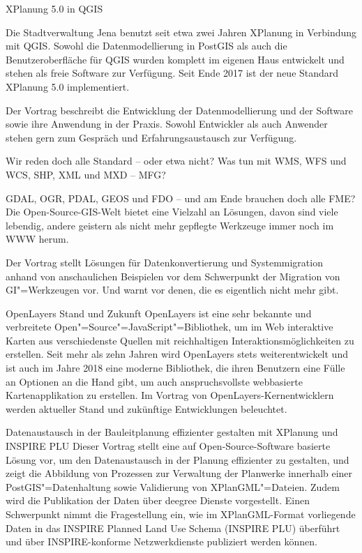 %
{XPlanung 5.0 in QGIS}%
{}%
{
Die Stadtverwaltung Jena benutzt seit etwa zwei Jahren XPlanung in Verbindung mit QGIS. Sowohl die
Datenmodellierung in PostGIS als auch die Benutzeroberfläche für QGIS wurden komplett im eigenen
Haus entwickelt und stehen als freie Software zur Verfügung. Seit Ende 2017 ist der neue Standard
XPlanung 5.0 implementiert.

Der Vortrag beschreibt die Entwicklung der Datenmodellierung und der
Software sowie ihre Anwendung in der Praxis. Sowohl Entwickler als auch Anwender stehen gern zum
Gespräch und Erfahrungsaustausch zur Verfügung.
}


%
{Wir reden doch alle Standard -- oder etwa nicht?}%
{Was tun mit WMS, WFS und WCS, SHP, XML und MXD -- MFG?}%
{
GDAL, OGR, PDAL, GEOS und FDO -- und am Ende brauchen doch alle FME?
Die Open-Source-GIS-Welt bietet eine Vielzahl an Lösungen, davon sind viele lebendig, andere
geistern als nicht mehr gepflegte Werkzeuge immer noch im WWW herum.

Der Vortrag stellt Lösungen
für Datenkonvertierung und Systemmigration anhand von anschaulichen Beispielen vor dem Schwerpunkt
der Migration von GI"=Werkzeugen vor. Und warnt vor denen, die es eigentlich nicht mehr gibt.%
}

%
{OpenLayers}%
{Stand und Zukunft}%
{
OpenLayers ist eine sehr bekannte und verbreitete Open"=Source"=JavaScript"=Bibliothek, um im Web
interaktive Karten aus verschiedenste Quellen mit reichhaltigen Interaktionsmöglichkeiten zu erstellen.
Seit mehr als zehn Jahren wird OpenLayers stets weiterentwickelt und ist auch im Jahre 2018 eine
moderne Bibliothek, die ihren Benutzern eine Fülle an Optionen an die Hand gibt, um auch
anspruchsvollste webbasierte Kartenapplikation zu erstellen.
%
Im Vortrag von OpenLayers-Kernentwicklern werden aktueller Stand und zukünftige Entwicklungen
beleuchtet.%
}

%
{Datenaustausch in der Bauleitplanung effizienter gestalten mit XPlanung und INSPIRE PLU}%
{}%
{
Dieser Vortrag stellt eine auf Open-Source-Software basierte Lösung vor, um den Datenaustausch in der
Planung effizienter zu gestalten, und zeigt die Abbildung von Prozessen zur Verwaltung der Planwerke
innerhalb einer PostGIS"=Datenhaltung sowie Validierung von XPlanGML"=Dateien. Zudem wird die
Publikation der Daten über deegree Dienste vorgestellt.  Einen Schwerpunkt nimmt die Fragestellung
ein, wie im XPlanGML-Format vorliegende Daten in das INSPIRE Planned Land Use Schema (INSPIRE PLU) überführt
und über INSPIRE-konforme Netzwerkdienste publiziert werden können.%
}

